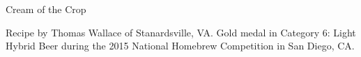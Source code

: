\begin{recipe}{Cream of the Crop} %

\begin{aboutblock}
Recipe by Thomas Wallace of Stanardsville, VA. Gold medal in Category 6: Light
Hybrid Beer during the 2015 National Homebrew Competition in San Diego, CA.
\sourceaha
\end{aboutblock}


\begin{methodandtiming}

\begin{mashsteps}
\end{mashsteps}

\begin{fermentationsteps}
\end{fermentationsteps}

\end{methodandtiming}

\recipebreak

\begin{ingredientsblock}

\begin{malts}
\end{malts}

\begin{hops}
\end{hops}


\end{ingredientsblock}

\end{recipe}

